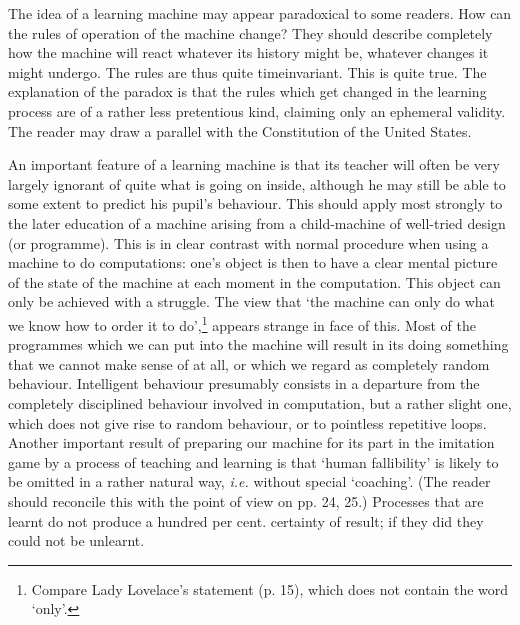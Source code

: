    The idea of a learning machine may appear paradoxical to some readers. How can the rules of operation of the machine change? They should describe completely how the machine will react whatever its history might be, whatever changes it might undergo. The rules are thus quite timeinvariant. This is quite true. The explanation of the paradox is that the rules which get changed in the learning process are of a rather less pretentious kind, claiming only an ephemeral validity. The reader may draw a parallel with the Constitution of the United States.

    An important feature of a learning machine is that its teacher will often be very largely ignorant of quite what is going on inside, although he may still be able to some extent to predict his pupil's behaviour. This should apply most strongly to the later education of a machine arising from a child-machine of well-tried design (or programme). This is in clear contrast with normal procedure when using a machine to do computations: one's object is then to have a clear mental picture of the state of the machine at each moment in the computation. This object can only be achieved with a struggle. The view that ‘the machine can only do what we know how to order it to do',\footnote[1]{Compare Lady Lovelace's statement (p. 15), which does not contain the word ‘only'.} appears strange in face of this. Most of the programmes which we can put into the machine will result in its doing something that we cannot make sense of at all, or which we regard as completely random behaviour. Intelligent behaviour presumably consists in a departure from the completely disciplined behaviour involved in computation, but a rather slight one, which does not give rise to random behaviour, or to pointless repetitive loops. Another important result of preparing our machine for its part in the imitation game by a process of teaching and learning is that ‘human fallibility' is likely to be omitted in a rather natural way, \textit{i.e.} without special ‘coaching'. (The reader should reconcile this with the point of view on pp. 24, 25.) Processes that are learnt do not produce a hundred per cent. certainty of result; if they did they could not be unlearnt.


